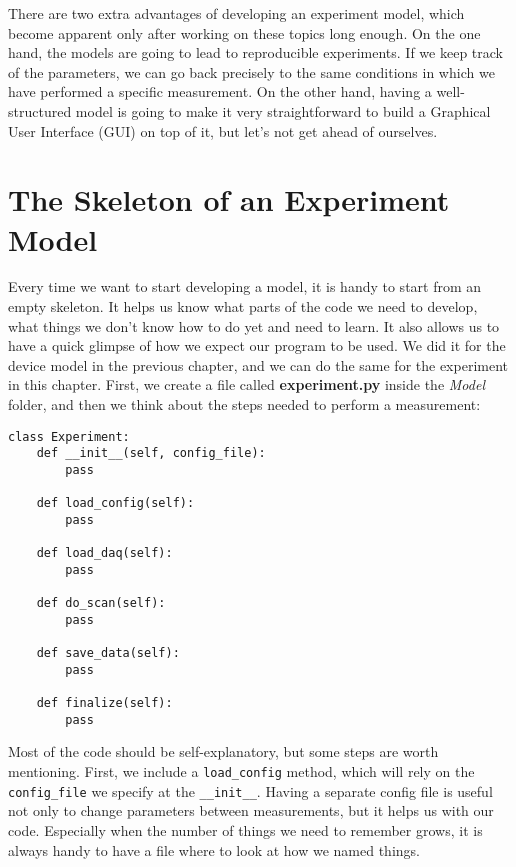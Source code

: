 There are two extra advantages of developing an experiment model, which become apparent only after working on these topics long enough. On the one hand, the models are going to lead to reproducible experiments. If we keep track of the parameters, we can go back precisely to the same conditions in which we have performed a specific measurement. On the other hand, having a well-structured model is going to make it very straightforward to build a Graphical User Interface ({GUI}) on top of it, but let's not get ahead of ourselves.

\section{The Skeleton of an Experiment Model}\label{section:skeleton-experiment-model}
Every time we want to start developing a model, it is handy to start from an empty skeleton. It helps us know what parts of the code we need to develop, what things we don't know how to do yet and need to learn. It also allows us to have a quick glimpse of how we expect our program to be used. We did it for the device model in the previous chapter, and we can do the same for the experiment in this chapter. First, we create a file called \textbf{experiment.py} inside the \emph{Model} folder, and then we think about the steps needed to perform a measurement:

\begin{verbatim}
class Experiment:
    def __init__(self, config_file):
        pass

    def load_config(self):
        pass

    def load_daq(self):
        pass

    def do_scan(self):
        pass

    def save_data(self):
        pass

    def finalize(self):
        pass

\end{verbatim}

Most of the code should be self-explanatory, but some steps are worth mentioning. First, we include a \texttt{load\_config} method, which will rely on the \texttt{config\_file} we specify at the \texttt{\_\_init\_\_}. Having a separate config file is useful not only to change parameters between measurements, but it helps us with our code. Especially when the number of things we need to remember grows, it is always handy to have a file where to look at how we named things.

